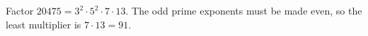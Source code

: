 Factor $20475=3^2\cdot5^2\cdot7\cdot13$. The odd prime exponents must be made even, so the least multiplier is $7\cdot13=\boxed{91}$.
